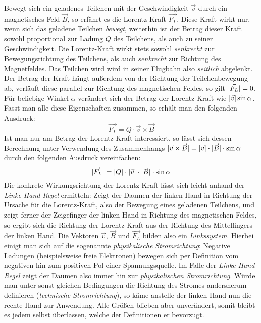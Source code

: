 Bewegt sich ein geladenes Teilchen mit der Geschwindigkeit \(\vec{v}\) durch ein magnetisches Feld \(\vec{B}\),
so erf\"ahrt es die Lorentz-Kraft \(\vec{F_L}\). Diese Kraft wirkt nur, wenn sich das geladene Teilchen \textit{bewegt}, weiterhin
ist der Betrag dieser Kraft sowohl proportional zur Ladung \(Q\) des Teilchens, als auch zu seiner Geschwindigkeit.
Die Lorentz-Kraft wirkt stets sowohl \textit{senkrecht} zur Bewegungsrichtung des Teilchens, als auch \textit{senkrecht} zur Richtung
des Magnetfeldes. Das Teilchen wird wird in seiner Flugbahn also
\textit{seitlich} abgelenkt. Der Betrag der Kraft h\"angt au{\ss}erdem von der Richtung der Teilchenbewegung ab, verl\"auft diese
parallel zur Richtung des magnetischen Feldes, so gilt \(\lvert\vec{F_L}\rvert = 0\). F\"ur beliebige Winkel \(\alpha\) ver\"andert
sich der Betrag der Lorentz-Kraft wie \(\lvert\vec{v}\rvert\sin{\alpha}\).
Fasst man alle diese Eigenschaften zusammen, so erh\"alt man den folgenden Ausdruck:
\begin{equation}
  \vec{F_L} = Q \cdot \vec{v} \times \vec{B}
\end{equation}
Ist man nur am Betrag der Lorentz-Kraft interessiert, so l\"asst sich dessen Berechnung unter Verwendung des Zusammenhangs
\(\lvert\vec{v} \times \vec{B}\rvert = \lvert\vec{v}\rvert \cdot \lvert\vec{B}\rvert \cdot \sin{\alpha} \) durch den folgenden Ausdruck vereinfachen:
\begin{equation}
  \lvert\vec{F_L}\rvert = \lvert Q\rvert \cdot \lvert\vec{v}\rvert \cdot \lvert\vec{B}\rvert \cdot \sin{\alpha}
\end{equation}
Die konkrete Wirkungsrichtung der Lorentz-Kraft l\"asst sich leicht anhand der \textit{Linke-Hand-Regel} ermitteln:
Zeigt der Daumen der linken Hand in Richtung der Ursache f\"ur die Lorentz-Kraft, also der Bewegung eines geladenen Teilchens,
und zeigt ferner der Zeigefinger der linken Hand in Richtung des magnetischen Feldes, so ergibt sich die Richtung der
Lorentz-Kraft aus der Richtung des Mittelfingers der linken Hand. Die Vektoren \(\vec{v}\), \(\vec{B}\) und \(\vec{F_L}\)
bilden also ein \textit{Linkssystem}.
Hierbei einigt man sich auf die sogenannte \textit{physikalische Stromrichtung}: Negative Ladungen (beispielsweise
freie Elektronen) bewegen sich per Definition vom negativen hin zum positiven Pol einer Spannungsquelle. Im Falle der
\textit{Linke-Hand-Regel} zeigt der Daumen also immer hin zur \textit{physikalischen Stromrichtung}.
W\"urde man unter sonst gleichen Bedingungen die Richtung des Stromes andersherum definieren (\textit{technische Stromrichtung}),
so k\"ame anstelle der linken Hand nun die rechte Hand zur Anwendung. Alle Gr\"o{\ss}en blieben aber unver\"andert, somit bleibt es
jedem selbst \"uberlassen, welche der Definitionen er bevorzugt.

